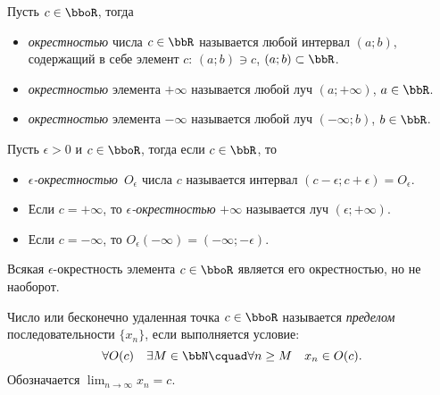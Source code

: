 \begin{defn}
Пусть $c \in \bboR$, тогда 
\begin{itemize}[wide, labelwidth=!, labelindent=0pt, nolistsep]
\item
\textit{окрестностью} числа $c \in \bbR$ называется любой интервал $(a;b)$, содержащий в себе элемент $c$: $(a;b)\ni c$, $(a;b) \subset \bbR$.
\item
\textit{окрестностью} элемента $+\infty$ называется любой луч $(a;+\infty)$, $a \in \bbR$.
\item
\textit{окрестностью} элемента $-\infty$ называется любой луч $(-\infty;b)$, $b \in \bbR$.
\end{itemize}
\end{defn}

\begin{defn}
Пусть $\epsilon > 0$ и $c \in \bboR $, тогда если $c \in \bbR$, то
\begin{itemize}[wide, labelwidth=!, labelindent=0pt, nolistsep]
\item
\textit{$\epsilon$-окрестностью}~$O_\epsilon$ числа $c$ называется интервал $(c-\epsilon;c+\epsilon) = O_\epsilon.$
\item
Если $c=+\infty$, то \textit{$\epsilon$-окрестностью} $+\infty$ называется луч $(\epsilon;+\infty)$.
\item
Если $c=-\infty$, то $O_\epsilon(-\infty)=(-\infty;-\epsilon)$.
\end{itemize}
\end{defn}
Всякая $\epsilon$-окрестность элемента $c \in \bboR$ является его окрестностью, но не наоборот.

\begin{defn}
Число или бесконечно удаленная точка $c \in \bboR$ называется \textit{пределом} последовательности $\{x_n\}$, если выполняется условие:
$$
\forall O(c)\quad \exists M \in \bbN\cquad \forall n \ge M\quad x_n \in O(c).
$$
Обозначается $\lim_{n \to \infty}\limits x_n = c$.
\end{defn}

